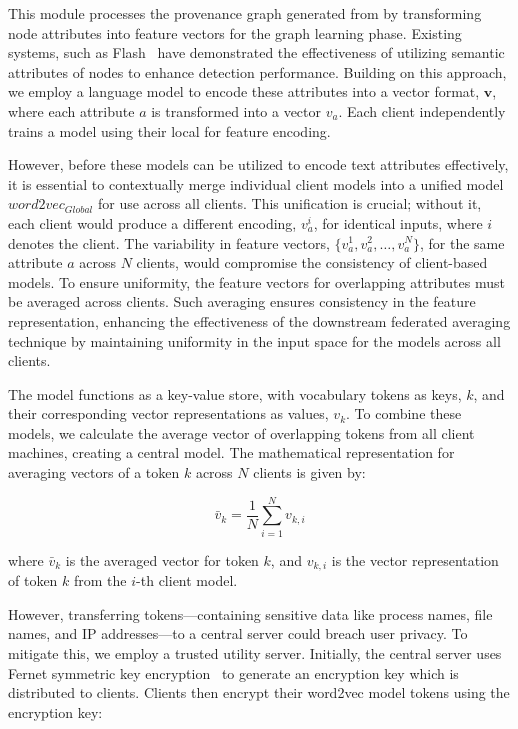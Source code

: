 This module processes the provenance graph generated from \logs by transforming node attributes into feature vectors for the graph learning phase. Existing systems, such as Flash~\cite{flash2024} have demonstrated the effectiveness of utilizing semantic attributes of nodes to enhance detection performance. Building on this approach, we employ a \wordvec language model to encode these attributes into a vector format, \(\mathbf{v}\), where each attribute \(a\) is transformed into a vector \(v_a\). Each client independently trains a \wordvec model using their local \logs for feature encoding.

However, before these models can be utilized to encode text attributes effectively, it is essential to contextually merge individual client \wordvec models into a unified model \( word2vec_{Global} \) for use across all clients. This unification is crucial; without it, each client would produce a different encoding, \(v_a^i\), for identical inputs, where \(i\) denotes the client. The variability in feature vectors, \(\{v_a^1, v_a^2, \ldots, v_a^N\}\), for the same attribute \(a\) across \(N\) clients, would compromise the consistency of client-based \gnnshort models. To ensure uniformity, the feature vectors for overlapping attributes must be averaged across clients. Such averaging ensures consistency in the feature representation, enhancing the effectiveness of the downstream federated averaging technique by maintaining uniformity in the input space for the \gnnshort models across all clients.

The \wordvec model functions as a key-value store, with vocabulary tokens as keys, \(k\), and their corresponding vector representations as values, \(v_k\). To combine these models, we calculate the average vector of overlapping tokens from all client machines, creating a central model. The mathematical representation for averaging vectors of a token \(k\) across \(N\) clients is given by:

\[
\bar{v}_k = \frac{1}{N} \sum_{i=1}^{N} v_{k,i}
\]

where \(\bar{v}_k\) is the averaged vector for token \(k\), and \(v_{k,i}\) is the vector representation of token \(k\) from the \(i\)-th client model.

However, transferring tokens—containing sensitive data like process names, file names, and IP addresses—to a central server could breach user privacy. To mitigate this, we employ a trusted utility server. Initially, the central server uses Fernet symmetric key encryption~\cite{ismail2020fernet,bokhari2016review} to generate an encryption key which is distributed to clients. Clients then encrypt their word2vec model tokens using the encryption key:

